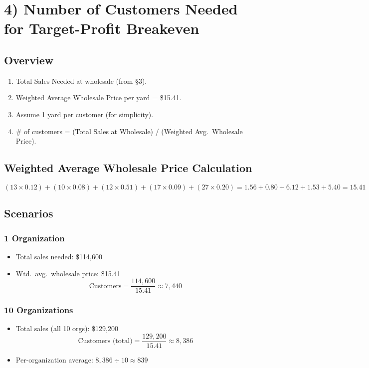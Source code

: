 \documentclass[12pt]{article}
\begin{document}
\clearpage

\section{4) Number of Customers Needed for Target-Profit Breakeven}

\subsection*{Overview}
\begin{enumerate}
    \item Total Sales Needed at wholesale (from \S 3).
    \item Weighted Average Wholesale Price per yard = \$15.41.
    \item Assume 1 yard per customer (for simplicity).
    \item \# of customers = (Total Sales at Wholesale) / (Weighted Avg.\ Wholesale Price).
\end{enumerate}

\subsection*{Weighted Average Wholesale Price Calculation}

\[
(13 \times 0.12) + (10 \times 0.08) + (12 \times 0.51) + (17 \times 0.09) + (27 \times 0.20) 
= 1.56 + 0.80 + 6.12 + 1.53 + 5.40 
= 15.41
\]

\subsection*{Scenarios}

\subsubsection*{1 Organization}
\begin{itemize}
    \item Total sales needed: \$114{,}600
    \item Wtd.\ avg.\ wholesale price: \$15.41
\[
\text{Customers} 
= \frac{114{,}600}{15.41} 
\approx 7{,}440
\]
\end{itemize}

\subsubsection*{10 Organizations}
\begin{itemize}
    \item Total sales (all 10 orgs): \$129{,}200
\[
\text{Customers (total)} 
= \frac{129{,}200}{15.41} 
\approx 8{,}386
\]
\item Per-organization average: \(8{,}386 \div 10 \approx 839\)
\end{itemize}
\end{document}

